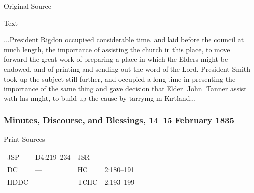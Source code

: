 				
				\begin{description}
					\item[Original Source]
				\end{description}
				
				
				\begin{description}
					\item[Text]
				\end{description}
				
					 ...President Rigdon occupieed considerable time. and laid before the council at much length, the importance of assisting the church in this place, to move forward the great work of preparing a place in which the Elders might be endowed, and of printing and sending out the word of the Lord. President Smith took up the subject still further, and occupied a long time in presenting the importance of the same thing and gave decision that Elder [John] Tanner assist with his might, to build up the cause by tarrying in Kirtland...
					 
		\subsubsection{Minutes, Discourse, and Blessings, 14--15 February 1835}
			\label{EMS-1835-JS-14-15-FEB-1835}
			
			\begin{description}
					\item[Print Sources]
				\end{description}

					\begin{tabular}{p{0.5in}p{1in}p{0.5in}p{1in}}
					JSP	 	& D4:219--234		& JSR 		& --- \\
					DC	 	& --- 				& HC 		& 2:180--191 \\
					HDDC 	& ---				& TCHC 		& 2:193--199 \\
					\end{tabular}
				
